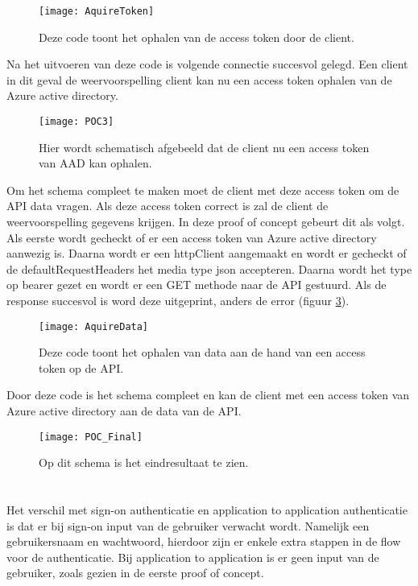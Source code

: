 \begin{figure}[H]
	\centering
	\texttt{[image: AquireToken]} 
	\caption[AuthConfig]{Deze code toont het ophalen van de access token door de client.}
	\label{fig:aquireToken}
\end{figure}\newpage
Na het uitvoeren van deze code is volgende connectie succesvol gelegd. Een client in dit geval de weervoorspelling client kan nu een access token ophalen van de Azure active directory.
\begin{figure}[H]
	\centering
	\texttt{[image: POC3]} 
	\caption[POC3]{Hier wordt schematisch afgebeeld dat de client nu een access token van AAD kan ophalen.}
	\label{fig:poc3}
\end{figure}
Om het schema compleet te maken moet de client met deze access token om de API data vragen. Als deze access token correct is zal de client de weervoorspelling gegevens krijgen. In deze proof of concept gebeurt dit als volgt.\newline
Als eerste wordt gecheckt of er een access token van Azure active directory aanwezig is. Daarna wordt er een httpClient aangemaakt en wordt er gecheckt of de defaultRequestHeaders het media type json accepteren. Daarna wordt het  type op bearer gezet en wordt er een GET methode naar de API gestuurd. Als de response succesvol is word deze uitgeprint, anders de error (figuur \ref{fig:aquireData}).
\begin{figure}[H]
	\centering
	\texttt{[image: AquireData]} 
	\caption[AquireData]{Deze code toont het ophalen van data aan de hand van een access token op de API.}
	\label{fig:aquireData}
\end{figure}\newpage
Door deze code is het schema compleet en kan de client met een access token van Azure active directory aan de data van de API.
\begin{figure}[H]
	\centering
	\texttt{[image: POC\_Final]} 
	\caption[POCFinal2]{Op dit schema is het eindresultaat te zien.}
	\label{fig:pocfinal2}
\end{figure}
\section{}
\label{sec:Microsift_signon}
Het verschil met sign-on authenticatie en application to application authenticatie is dat er bij sign-on input van de gebruiker verwacht wordt. Namelijk een gebruikersnaam en wachtwoord, hierdoor zijn er enkele extra stappen in de flow voor de authenticatie. Bij application to application is er geen input van de gebruiker, zoals gezien in de eerste proof of concept.
